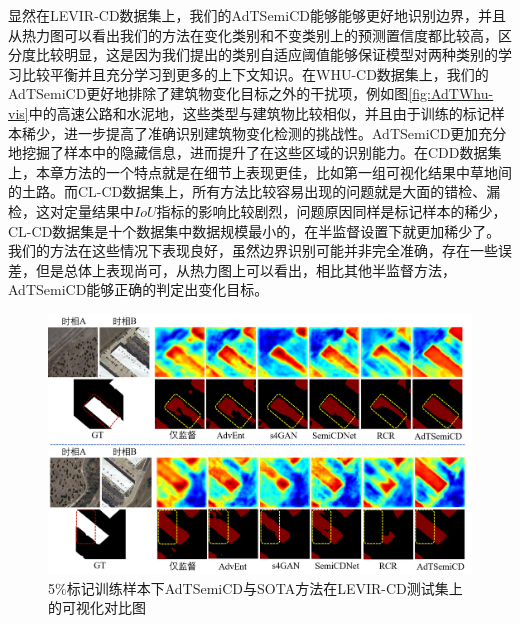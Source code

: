 \documentclass[lang=chs, degree=master, blindreview=false, adobe=false]{yanputhesis}
\begin{document}
显然在LEVIR-CD数据集上，我们的AdTSemiCD能够能够更好地识别边界，并且从热力图可以看出我们的方法在变化类别和不变类别上的预测置信度都比较高，区分度比较明显，这是因为我们提出的类别自适应阈值能够保证模型对两种类别的学习比较平衡并且充分学习到更多的上下文知识。在WHU-CD数据集上，我们的AdTSemiCD更好地排除了建筑物变化目标之外的干扰项，例如图\ref{fig:AdTWhu-vis}中的高速公路和水泥地，这些类型与建筑物比较相似，并且由于训练的标记样本稀少，进一步提高了准确识别建筑物变化检测的挑战性。AdTSemiCD更加充分地挖掘了样本中的隐藏信息，进而提升了在这些区域的识别能力。在CDD数据集上，本章方法的一个特点就是在细节上表现更佳，比如第一组可视化结果中草地间的土路。而CL-CD数据集上，所有方法比较容易出现的问题就是大面的错检、漏检，这对定量结果中$IoU$指标的影响比较剧烈，问题原因同样是标记样本的稀少，CL-CD数据集是十个数据集中数据规模最小的，在半监督设置下就更加稀少了。我们的方法在这些情况下表现良好，虽然边界识别可能并非完全准确，存在一些误差，但是总体上表现尚可，从热力图上可以看出，相比其他半监督方法，AdTSemiCD能够正确的判定出变化目标。
\begin{figure}[!htbp]
  \centering
  \includegraphics[scale=0.45]{images/AdTlevir-vis.png}
  \caption{
    5$\%$标记训练样本下AdTSemiCD与SOTA方法在LEVIR-CD测试集上的可视化对比图
  }
  \label{fig:AdTLevir-vis}
\end{figure}
\end{document}
